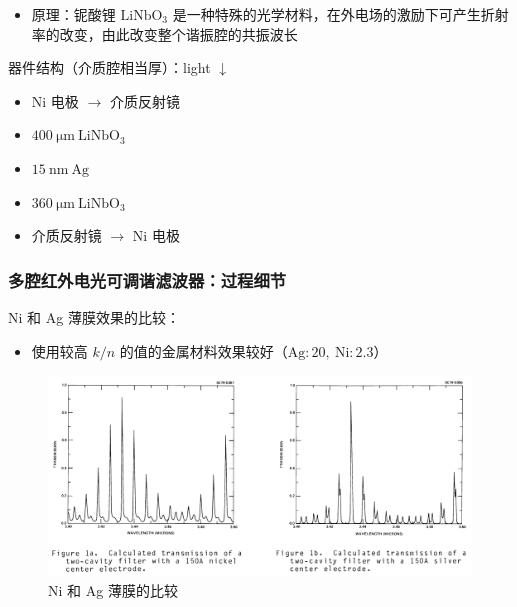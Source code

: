 \begin{frame}[c]
    \begin{itemize}
        \item 原理：铌酸锂 $\mathrm{LiNbO}_3$ 是一种特殊的光学材料，在外电场的激励下可产生折射率的改变，由此改变整个谐振腔的共振波长
    \end{itemize}
    器件结构（介质腔相当厚）：light $\downarrow$
    \begin{itemize}
        \item Ni 电极 $\rightarrow$ 介质反射镜
        \item $400\ \mathrm{\mu m}\ \mathrm{LiNbO}_3$
        \item $15\ \mathrm{nm}\ \mathrm{Ag}$
        \item $360\ \mathrm{\mu m}\ \mathrm{LiNbO}_3$
        \item 介质反射镜 $\rightarrow$ Ni 电极
    \end{itemize}
\end{frame}

\begin{frame}[c]
    \frametitle{多腔红外电光可调谐滤波器：过程细节}
    \textrm{Ni} 和 \textrm{Ag} 薄膜效果的比较：
    \begin{itemize}
        \item 使用较高 $k/n$ 的值的金属材料效果较好（$\mathrm{Ag: }20,\ \mathrm{Ni: }2.3$）
    \end{itemize}

    \begin{figure}[H] %
        \centering %
        \includegraphics[width=1.\textwidth]{figures/Multiple-Cavity Infrared Electro-Optic Tunable Filter_1.png} %
        \caption{\textrm{Ni} 和 \textrm{Ag} 薄膜的比较}
    \end{figure}
\end{frame}

